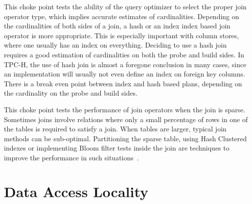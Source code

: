



This choke point tests the ability of the query optimizer to select the proper join operator type, which implies accurate estimates of cardinalities.
Depending on the cardinalities of both sides of a join, a hash or an index index based join operator is more appropriate.
This is especially important with column stores, where one usually has an index on everything. Deciding to use a hash join requires a good estimation of cardinalities on both the probe and build sides.
In TPC-H, the use of hash join is almost a foregone conclusion in many cases, since an implementation will usually not even define an index on foreign key columns.
There is a break even point between index and hash based plans, depending on the cardinality on the probe and build sides.





This choke point tests the performance of join operators when the join is sparse. Sometimes joins involve relations where only a small percentage of rows in one of the tables is required to satisfy a join. When tables are larger, typical join methods can be sub-optimal. Partitioning the sparse table, using Hash Clustered indexes or implementing Bloom filter tests inside the join are techniques to improve the performance in such situations~\cite{DBLP:journals/csur/Graefe93}.




\section{Data Access Locality}



